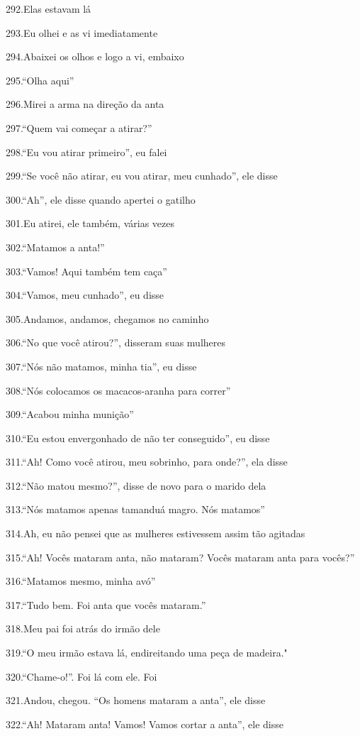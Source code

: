 292.Elas estavam lá

293.Eu olhei e as vi imediatamente

294.Abaixei os olhos e logo a vi, embaixo

295.``Olha aqui''

296.Mirei a arma na direção da anta

297.``Quem vai começar a atirar?''

298.``Eu vou atirar primeiro'', eu falei

299.``Se você não atirar, eu vou atirar, meu cunhado'', ele disse

300.``Ah'', ele disse quando apertei o gatilho

301.Eu atirei, ele também, várias vezes

302.``Matamos a anta!''

303.``Vamos! Aqui também tem caça''

304.``Vamos, meu cunhado'', eu disse

305.Andamos, andamos, chegamos no caminho

306.``No que você atirou?'', disseram suas mulheres

307.``Nós não matamos, minha tia'', eu disse

308.``Nós colocamos os macacos-aranha para correr''

309.``Acabou minha munição''

310.``Eu estou envergonhado de não ter conseguido'', eu disse

311.``Ah! Como você atirou, meu sobrinho, para onde?'', ela disse

312.``Não matou mesmo?'', disse de novo para o marido dela

313.``Nós matamos apenas tamanduá magro. Nós matamos''

314.Ah, eu não pensei que as mulheres estivessem assim tão agitadas

315.``Ah! Vocês mataram anta, não mataram? Vocês mataram anta para
vocês?''

316.``Matamos mesmo, minha avó''

317.``Tudo bem. Foi anta que vocês mataram.''

318.Meu pai foi atrás do irmão dele

319.``O meu irmão estava lá, endireitando uma peça de madeira."

320.``Chame-o!''. Foi lá com ele. Foi

321.Andou, chegou. ``Os homens mataram a anta'', ele disse

322.``Ah! Mataram anta! Vamos! Vamos cortar a anta'', ele disse

